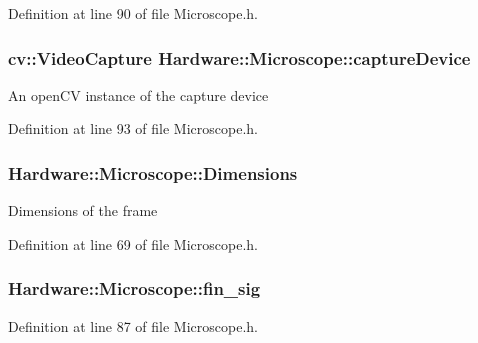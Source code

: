 Definition at line 90 of file Microscope.\+h.

\hypertarget{class_hardware_1_1_microscope_a8fd921d7c937e808c5bc44c0294aa490}{}
\subsubsection[{capture\+Device}]{\setlength{\rightskip}{0pt plus 5cm}cv\+::\+Video\+Capture Hardware\+::\+Microscope\+::capture\+Device\hspace{0.3cm}{\ttfamily [private]}}\label{class_hardware_1_1_microscope_a8fd921d7c937e808c5bc44c0294aa490}
An open\+C\+V instance of the capture device 

Definition at line 93 of file Microscope.\+h.

\hypertarget{class_hardware_1_1_microscope_ae89c25318a095e2efcdf48fb8f769038}{}
\subsubsection[{Dimensions}]{ Hardware\+::\+Microscope\+::\+Dimensions}\label{class_hardware_1_1_microscope_ae89c25318a095e2efcdf48fb8f769038}
Dimensions of the frame 

Definition at line 69 of file Microscope.\+h.

\hypertarget{class_hardware_1_1_microscope_a8c23e6a55ef77443e861418a15c6e244}{}
\subsubsection[{fin\+\_\+sig}]{ Hardware\+::\+Microscope\+::fin\+\_\+sig\hspace{0.3cm}{\ttfamily [private]}}\label{class_hardware_1_1_microscope_a8c23e6a55ef77443e861418a15c6e244}


Definition at line 87 of file Microscope.\+h.

\hypertarget{class_hardware_1_1_microscope_ac2da14781a22924a389fc287df3dbfda}{}
